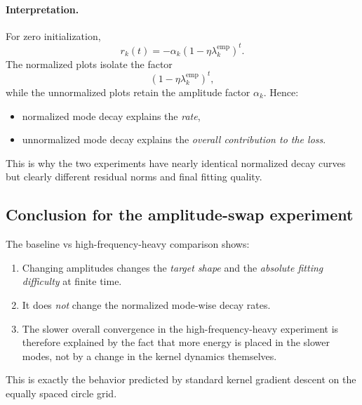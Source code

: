 \documentclass[11pt]{article}
\begin{document}
\paragraph{Interpretation.}
For zero initialization,
\[
	r_k(t) = -\alpha_k (1-\eta\lambda_k^{\mathrm{emp}})^t.
\]
The normalized plots isolate the factor
\[
	(1-\eta\lambda_k^{\mathrm{emp}})^t,
\]
while the unnormalized plots retain the amplitude factor $\alpha_k$.
Hence:
\begin{itemize}
	\item normalized mode decay explains the \emph{rate},
	\item unnormalized mode decay explains the \emph{overall contribution to the loss}.
\end{itemize}

This is why the two experiments have nearly identical normalized decay curves but clearly different residual norms and final fitting quality.

\subsection*{Conclusion for the amplitude-swap experiment}

The baseline vs high-frequency-heavy comparison shows:
\begin{enumerate}
	\item Changing amplitudes changes the \emph{target shape} and the \emph{absolute fitting difficulty} at finite time.
	\item It does \emph{not} change the normalized mode-wise decay rates.
	\item The slower overall convergence in the high-frequency-heavy experiment is therefore explained by the fact that more energy is placed in the slower modes, not by a change in the kernel dynamics themselves.
\end{enumerate}

This is exactly the behavior predicted by standard kernel gradient descent on the equally spaced circle grid.
\end{document}
